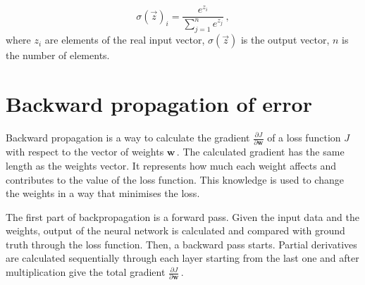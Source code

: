 \begin{equation}
	\sigma(\vec z)_i = \frac{e^{z_i}}{\sum\limits_{j=1}^n e^{z_j}}\,,
\end{equation}
where $z_i$ are elements of the real input vector, $\sigma(\vec z)$ is the output vector, $n$ is the number of elements.




\section{Backward propagation of error}
\label{backprop}

Backward propagation is a way to calculate the gradient $\frac{\partial J}{\partial \textbf{w}}$ of a loss function $J$ with respect to the vector of weights $\textbf{w}$\,. The calculated gradient has the same length as the weights vector. It represents how much each weight affects and contributes to the value of the loss function. This knowledge is used to change the weights in a way that minimises the loss. 

The first part of backpropagation is a forward pass. Given the input data and the weights, output of the neural network is calculated and compared with ground truth through the loss function. Then, a backward pass starts. Partial derivatives are calculated sequentially through each layer starting from the last one and after multiplication give the total gradient $\frac{\partial J}{\partial \textbf{w}}$\,.

